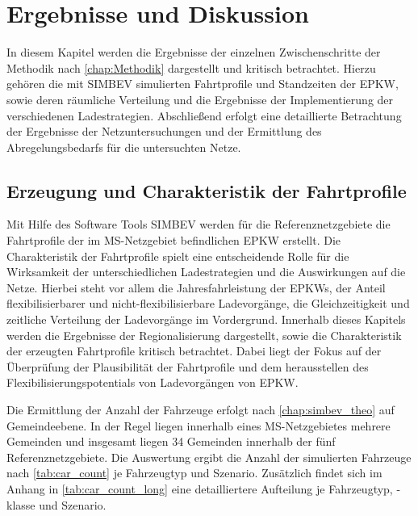 \section{Ergebnisse und Diskussion}\label{chap:results}

In diesem Kapitel werden die Ergebnisse der einzelnen Zwischenschritte der Methodik nach \autoref{chap:Methodik} dargestellt und kritisch betrachtet.
Hierzu gehören die mit \gls{SIMBEV} simulierten Fahrtprofile und Standzeiten der \gls{EPKW}, sowie deren räumliche Verteilung und die Ergebnisse der Implementierung der verschiedenen Ladestrategien.
Abschließend erfolgt eine detaillierte Betrachtung der Ergebnisse der Netzuntersuchungen und der Ermittlung des Abregelungsbedarfs für die untersuchten Netze.


\subsection{Erzeugung und Charakteristik der Fahrtprofile}

Mit Hilfe des Software Tools \gls{SIMBEV} werden für die Referenznetzgebiete die Fahrtprofile der im \gls{MS}-Netzgebiet befindlichen \gls{EPKW} erstellt.
Die Charakteristik der Fahrtprofile spielt eine entscheidende Rolle für die Wirksamkeit der unterschiedlichen Ladestrategien und die Auswirkungen auf die Netze.
Hierbei steht vor allem die Jahresfahrleistung der \glspl{EPKW}, der Anteil flexibilisierbarer und nicht-flexibilisierbare Ladevorgänge, die Gleichzeitigkeit und zeitliche Verteilung der Ladevorgänge im Vordergrund.
Innerhalb dieses Kapitels werden die Ergebnisse der Regionalisierung dargestellt, sowie die Charakteristik der erzeugten Fahrtprofile kritisch betrachtet.
Dabei liegt der Fokus auf der Überprüfung der Plausibilität der Fahrtprofile und dem herausstellen des Flexibilisierungspotentials von Ladevorgängen von \gls{EPKW}.\medskip

Die Ermittlung der Anzahl der Fahrzeuge erfolgt nach \autoref{chap:simbev_theo} auf Gemeindeebene.
In der Regel liegen innerhalb eines \gls{MS}-Netzgebietes mehrere Gemeinden und insgesamt liegen \num{34} Gemeinden innerhalb der fünf Referenznetzgebiete.
Die Auswertung ergibt die Anzahl der simulierten Fahrzeuge nach \autoref{tab:car_count} je Fahrzeugtyp und Szenario.
Zusätzlich findet sich im Anhang in \autoref{tab:car_count_long} eine detailliertere Aufteilung je Fahrzeugtyp, -klasse und Szenario.



